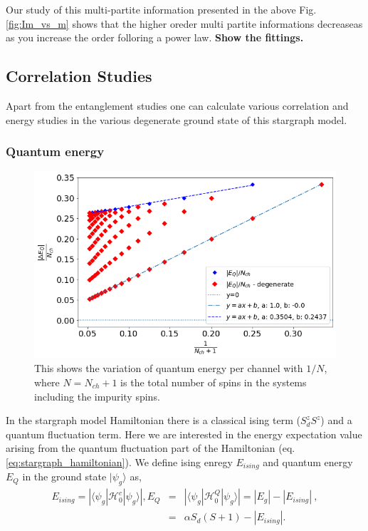 \documentclass[reprint,prb,superscriptaddress]{revtex4-1}
\begin{document}
\noindent Our study of this multi-partite information presented in the above Fig.\eqref{fig:Im_vs_m} shows that the higher oreder multi partite informations decreaseas as you increase the order folloring a power law. \textbf{Show the fittings.}



\subsection{Correlation Studies}
Apart from the entanglement studies one can calculate various correlation and energy studies in the various degenerate ground state of this stargraph model.
\subsubsection{Quantum energy}
\begin{figure}[!h]
\centering
\includegraphics[scale=0.34]{plt/Quantum_Energy_per_channel}
\caption{This shows the variation of quantum energy per channel with $1/N$, where $N=N_{ch}+1$ is the total number of spins in the systems including the impurity spins. }
\label{fig:quantum_energy}
\end{figure}
\noindent In the stargraph model Hamiltonian there is a classical ising term ($S_d^zS^z$) and a quantum fluctuation term. Here we are interested in the energy expectation value arising from the quantum fluctuation part of the Hamiltonian (eq.\ref{eq:stargraph_hamiltonian}). We define ising enregy $E_{ising}$ and quantum energy $E_{Q}$ in the ground state $|\psi_g\rangle$ as,
\begin{eqnarray}
E_{ising} = |\langle \psi_g | \mathcal{H}^c_0 | \psi_g \rangle|, E_{Q} &=& |\langle \psi_g | \mathcal{H}^Q_0 | \psi_g \rangle|=|E_g|-|E_{ising}|~, \nonumber\\
&=& {\alpha S_d(S+1)}- |E_{ising}|.
\end{eqnarray}  
\end{document}
